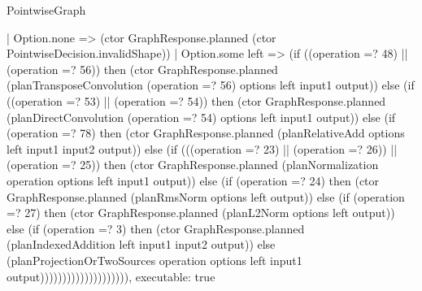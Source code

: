 \begin{lexlean}{PointwiseGraph}
\begin{semanticmodule}
{      | Option.none => (ctor GraphResponse.planned (ctor PointwiseDecision.invalidShape))
      | Option.some left => (if ((operation =? 48) || (operation =? 56)) then (ctor GraphResponse.planned (planTransposeConvolution (operation =? 56) options left input1 output)) else (if ((operation =? 53) || (operation =? 54)) then (ctor GraphResponse.planned (planDirectConvolution (operation =? 54) options left input1 output)) else (if (operation =? 78) then (ctor GraphResponse.planned (planRelativeAdd options left input1 input2 output)) else (if (((operation =? 23) || (operation =? 26)) || (operation =? 25)) then (ctor GraphResponse.planned (planNormalization operation options left input1 output)) else (if (operation =? 24) then (ctor GraphResponse.planned (planRmsNorm options left output)) else (if (operation =? 27) then (ctor GraphResponse.planned (planL2Norm options left output)) else (if (operation =? 3) then (ctor GraphResponse.planned (planIndexedAddition left input1 input2 output)) else (planProjectionOrTwoSources operation options left input1 output)))))))))))))))))))),
  executable: true
}


\end{semanticmodule}
\end{lexlean}
